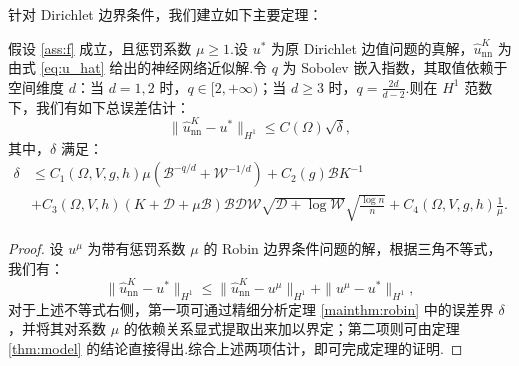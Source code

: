 针对 Dirichlet 边界条件，我们建立如下主要定理：
\begin{theorem}\label{mainthm:diri}
假设 \ref{ass:f} 成立，且惩罚系数 $\mu\geq 1$.设 $u^*$ 为原 Dirichlet 边值问题的真解，$\widehat{u}_{\text{nn}}^{K}$ 为由式 \eqref{eq:u_hat} 给出的神经网络近似解.令 $q$ 为 Sobolev 嵌入指数，其取值依赖于空间维度 $d$：当 $d=1,2$ 时，$q \in [2, +\infty)$；当 $d\geq 3$ 时，$q = \frac{2d}{d-2}$.则在 $H^1$ 范数下，我们有如下总误差估计：
\begin{equation*}
\|\widehat{u}_{\text{nn}}^{K}-u^{*}\|_{H^{1}}\leq C(\Omega)\sqrt{\delta},
\end{equation*}
其中，$\delta$ 满足：
\begin{equation*}
\begin{aligned}
\delta&\leq C_1\left(\Omega, V, g, h\right) \mu\left(\mathcal{B}^{-q / d}+\mathcal{W}^{-1 / d}\right)+C_2(g) \mathcal{B}K^{-1}\\
{}&\displaystyle+C_3(\Omega, V, h)(K+\mathcal{D}+\mu \mathcal{B}) \mathcal{B} \mathcal{D} \mathcal{W} \sqrt{\mathcal{D}+\log \mathcal{W}} \sqrt{\frac{\log n}{n}}+C_4(\Omega,V,g,h)\frac{1}{\mu}.
\end{aligned}
\end{equation*}
\end{theorem}
\begin{proof}
设 $u^{\mu}$ 为带有惩罚系数 $\mu$ 的 Robin 边界条件问题的解，根据三角不等式，我们有：
\begin{equation*}
\|\widehat{u}_{\text{nn}}^{K}-u^{*}\|_{H^{1}}\leq \|\widehat{u}_{\text{nn}}^{K}-u^{\mu}\|_{H^{1}}+\|u^{\mu}-u^{*}\|_{H^{1}},
\end{equation*}
对于上述不等式右侧，第一项可通过精细分析定理 \ref{mainthm:robin} 中的误差界 $\delta$，并将其对系数 $\mu$ 的依赖关系显式提取出来加以界定；第二项则可由定理 \ref{thm:model} 的结论直接得出.综合上述两项估计，即可完成定理的证明.
\end{proof}

